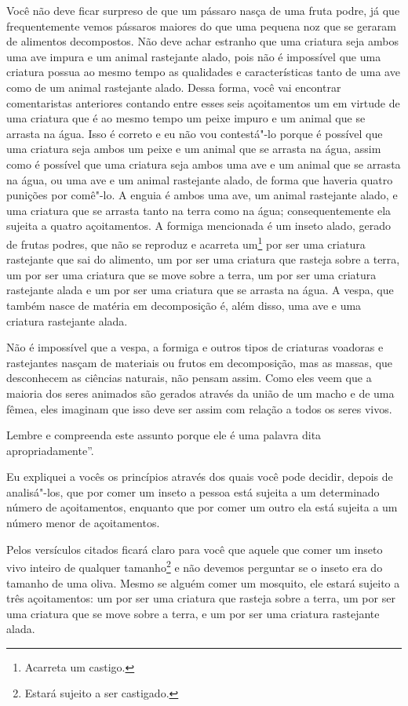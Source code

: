 \begin{multicols}{2}
Você não deve ficar surpreso de que um pássaro nasça de uma fruta podre,
já que frequentemente vemos pássaros maiores do que uma pequena noz que
se geraram de alimentos decompostos. Não deve achar estranho que uma
criatura seja ambos uma ave impura e um animal rastejante alado, pois
não é impossível que uma criatura possua ao mesmo tempo as qualidades e
características tanto de uma ave como de um animal rastejante alado.
Dessa forma, você vai encontrar comentaristas anteriores contando entre
esses seis açoitamentos um em virtude de uma criatura que é ao mesmo
tempo um peixe impuro e um animal que se arrasta na água. Isso é
correto e eu não vou contestá"-lo porque é possível que uma criatura seja
ambos um peixe e um animal que se arrasta na água, assim como é possível
que uma criatura seja ambos uma ave e um animal que se arrasta na água,
ou uma ave e um animal rastejante alado, de forma que haveria quatro
punições por comê"-lo. A enguia é ambos uma ave, um animal rastejante
alado, e uma criatura que se arrasta tanto na terra como na água;
consequentemente ela sujeita a quatro açoitamentos. A formiga
mencionada é um inseto alado, gerado de frutas podres, que não se
reproduz e acarreta um\footnote{Acarreta um castigo.} por ser uma criatura
rastejante que sai do alimento, um por ser uma criatura que rasteja
sobre a terra, um por ser uma criatura que se move sobre a terra, um por
ser uma criatura rastejante alada e um por ser uma criatura que se
arrasta na água. A vespa, que também nasce de matéria em decomposição é,
além disso, uma ave e uma criatura rastejante alada.

Não é impossível que a vespa, a formiga e outros tipos de criaturas
voadoras e rastejantes nasçam de materiais ou frutos em decomposição,
mas as massas, que desconhecem as ciências naturais, não pensam assim.
Como eles veem que a maioria dos seres animados são gerados através da
união de um macho e de uma fêmea, eles imaginam que isso deve ser assim
com relação a todos os seres vivos.

Lembre e compreenda este assunto porque ele é uma palavra dita
apropriadamente''.

Eu expliquei a vocês os princípios através dos quais você pode decidir,
depois de analisá"-los, que por comer um inseto a pessoa está sujeita a
um determinado número de açoitamentos, enquanto que por comer um outro
ela está sujeita a um número menor de açoitamentos.

Pelos versículos citados ficará claro para você que aquele que comer um
inseto vivo inteiro de qualquer tamanho\footnote{Estará sujeito a ser castigado.} e não
devemos perguntar se o inseto era do tamanho de uma oliva. Mesmo se
alguém comer um mosquito, ele estará sujeito a três açoitamentos: um
por ser uma criatura que rasteja sobre a terra, um por ser uma criatura
que se move sobre a terra, e um por ser uma criatura rastejante alada.


\end{multicols}
